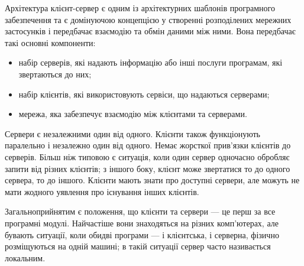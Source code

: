 Архітектура клієнт-сервер є одним із архітектурних шаблонів програмного забезпечення та є домінуючою концепцією у створенні розподілених мережних застосунків і передбачає взаємодію та обмін даними між ними. Вона передбачає такі основні компоненти:
\begin{itemize}
	\item набір серверів, які надають інформацію або інші послуги програмам, які звертаються до них;
	\item набір клієнтів, які використовують сервіси, що надаються серверами;
	\item мережа, яка забезпечує взаємодію між клієнтами та серверами.
\end{itemize}

Сервери є незалежними один від одного. Клієнти також функціонують паралельно і незалежно один від одного. Немає жорсткої прив'язки клієнтів до серверів. Більш ніж типовою є ситуація, коли один сервер одночасно обробляє запити від різних клієнтів; з іншого боку, клієнт може звертатися то до одного сервера, то до іншого. Клієнти мають знати про доступні сервери, але можуть не мати жодного уявлення про існування інших клієнтів.

Загальноприйнятим є положення, що клієнти та сервери — це перш за все програмні модулі. Найчастіше вони знаходяться на різних комп'ютерах, але бувають ситуації, коли обидві програми — і клієнтська, і серверна, фізично розміщуються на одній машині; в такій ситуації сервер часто називається локальним.
